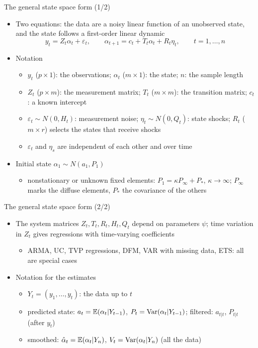 \begin{frame}{The general state space form (1/2)}
\itemsize{\small}
\begin{itemize}
    \item Two equations: the data are a noisy linear function of an unobserved state, and the state follows a first-order linear dynamic \[ y_t = Z_t\alpha_t + \varepsilon_t, \qquad \alpha_{t+1} = c_t + T_t\alpha_t + R_t\eta_t, \qquad t = 1, \dots, n \]
    \item Notation
    \begin{itemize}
        \item $y_t$ ($p\times 1$): the observations; $\alpha_t$ ($m\times 1$): the state; $n$: the sample length
        \item $Z_t$ ($p\times m$): the measurement matrix; $T_t$ ($m\times m$): the transition matrix; $c_t$: a known intercept
        \item $\varepsilon_t \sim N(0, H_t)$: measurement noise; $\eta_t \sim N(0, Q_t)$: state shocks; $R_t$ ($m\times r$) selects the states that receive shocks
        \item $\varepsilon_t$ and $\eta_s$ are independent of each other and over time
    \end{itemize}
    \item Initial state $\alpha_1 \sim N(a_1, P_1)$
    \begin{itemize}
        \item nonstationary or unknown fixed elements: $P_1 = \kappa P_\infty + P_*$, $\kappa \to \infty$; $P_\infty$ marks the diffuse elements, $P_*$ the covariance of the others
    \end{itemize}
\end{itemize}
\end{frame}

\begin{frame}{The general state space form (2/2)}
\itemsize{\small}
\begin{itemize}
    \item The system matrices $Z_t, T_t, R_t, H_t, Q_t$ depend on parameters $\psi$; time variation in $Z_t$ gives regressions with time-varying coefficients
    \begin{itemize}
        \item ARMA, UC, TVP regressions, DFM, VAR with missing data, ETS: all are special cases 
    \end{itemize}
    \item Notation for the estimates
    \begin{itemize}
        \item $Y_t = (y_1, \dots, y_t)$: the data up to $t$
        \item predicted state: $a_t = \mathbb{E}(\alpha_t | Y_{t-1})$, $P_t = \text{Var}(\alpha_t | Y_{t-1})$; filtered: $a_{t|t}$, $P_{t|t}$ (after $y_t$)
        \item smoothed: $\hat\alpha_t = \mathbb{E}(\alpha_t | Y_n)$, $V_t = \text{Var}(\alpha_t | Y_n)$ (all the data)
    \end{itemize}
\end{itemize}
\end{frame}

